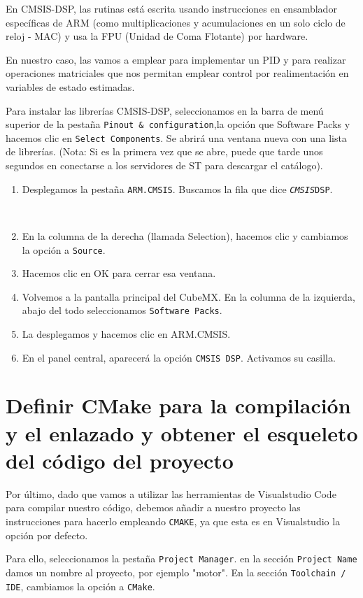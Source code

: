 En CMSIS-DSP, las rutinas está escrita usando instrucciones en ensamblador específicas de ARM (como multiplicaciones y acumulaciones en un solo ciclo de reloj - MAC) y usa la FPU (Unidad de Coma Flotante) por hardware.

En nuestro caso, las vamos a emplear para implementar un PID y para realizar operaciones matriciales que nos permitan emplear control por realimentación en variables de estado estimadas.

Para instalar las librerías CMSIS-DSP, seleccionamos en la barra de menú superior de la pestaña \texttt{Pinout \& configuration},la opción que Software Packs y hacemos clic en \texttt{Select Components}. Se abrirá una ventana nueva con una lista de librerías.
(Nota: Si es la primera vez que se abre, puede que tarde unos segundos en conectarse a los servidores de ST para descargar el catálogo).
\begin{enumerate}
	\item Desplegamos la pestaña \texttt{ARM.CMSIS}. Buscamos la fila que dice \texttt{\emph{CMSIS}DSP}.

\	\item En la columna de la derecha (llamada Selection), hacemos clic y cambiamos la opción a \texttt{Source}.

    \item Hacemos clic en OK para cerrar esa ventana. 
    \item Volvemos a la pantalla principal del CubeMX. En la columna de la izquierda, abajo del todo seleccionamos \texttt{Software Packs}.
    \item La desplegamos y hacemos clic en ARM.CMSIS.
    \item En el panel central, aparecerá la opción \texttt{CMSIS DSP}. Activamos su casilla. 
\end{enumerate}

\section{Definir CMake para la compilación y el enlazado y obtener el esqueleto del código del proyecto}
Por último, dado que vamos a utilizar las herramientas de Visualstudio Code para compilar nuestro código, debemos añadir a nuestro proyecto las instrucciones para hacerlo empleando \texttt{CMAKE}, ya que esta es en Visualstudio la opción por defecto.

Para ello, seleccionamos la pestaña \texttt{Project Manager}. en la sección \texttt{Project Name} damos un nombre al proyecto, por ejemplo "motor". En la sección \texttt{Toolchain / IDE}, cambiamos la opción a \texttt{CMake}.

